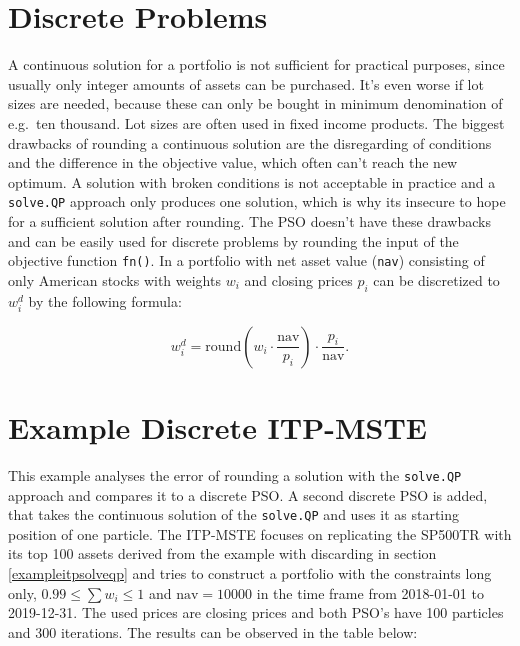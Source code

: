 \documentclass[
  oneside, a4paper, 12pt, openany]{book}
\theoremstyle{definition}
\theoremstyle{definition}
\theoremstyle{definition}
\theoremstyle{definition}
\theoremstyle{remark}
\begin{document}
\hypertarget{discrete-problems}{%
\section{Discrete Problems}\label{discrete-problems}}

A continuous solution for a portfolio is not sufficient for practical purposes, since usually only integer amounts of assets can be purchased. It's even worse if lot sizes are needed, because these can only be bought in minimum denomination of e.g.~ten thousand. Lot sizes are often used in fixed income products. The biggest drawbacks of rounding a continuous solution are the disregarding of conditions and the difference in the objective value, which often can't reach the new optimum. A solution with broken conditions is not acceptable in practice and a \texttt{solve.QP} approach only produces one solution, which is why its insecure to hope for a sufficient solution after rounding. The PSO doesn't have these drawbacks and can be easily used for discrete problems by rounding the input of the objective function \texttt{fn()}. In a portfolio with net asset value (\texttt{nav}) consisting of only American stocks with weights \(w_i\) and closing prices \(p_i\) can be discretized to \(w_i^d\) by the following formula:

\[
  w_i^d =\text{round}(w_i \cdot \frac{\text{nav}}{p_i})\cdot \frac{p_i}{\text{nav}}.
\]

\hypertarget{example-discrete-itp-mste}{%
\section{Example Discrete ITP-MSTE}\label{example-discrete-itp-mste}}

This example analyses the error of rounding a solution with the \texttt{solve.QP} approach and compares it to a discrete PSO. A second discrete PSO is added, that takes the continuous solution of the \texttt{solve.QP} and uses it as starting position of one particle. The ITP-MSTE focuses on replicating the SP500TR with its top 100 assets derived from the example with discarding in section \ref{exampleitpsolveqp} and tries to construct a portfolio with the constraints long only, \(0.99 \leq \textstyle\sum w_i \leq 1\) and \(\text{nav} = 10000\) in the time frame from 2018-01-01 to 2019-12-31. The used prices are closing prices and both PSO's have 100 particles and 300 iterations. The results can be observed in the table below:
\end{document}
